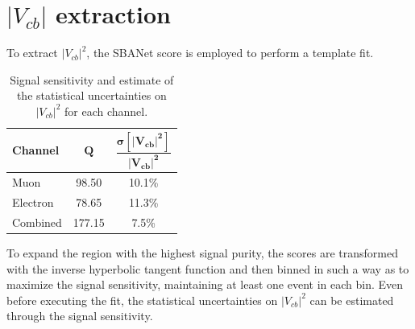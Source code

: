 \section{$|V_{cb}|$ extraction}
To extract $|V_{cb}|^2$, the SBANet score is employed to perform a template fit.

\begin{minipage}{\linewidth}
\begin{minipage}{0.43\linewidth}
\begin{table}[H]
    \centering
    \begin{tabular}{l|cc}
    \toprule
        \textbf{Channel} & $\bm{Q}$ & $\dfrac{\bm{\sigma[|V_{cb}|^2]}}{\bm{|V_{cb}|^2}}$ \\
        \midrule
         Muon & 98.50 & 10.1\%\\
         Electron & 78.65 &  11.3\%\\
         Combined & 177.15 & 7.5\%\\
         \bottomrule
    \end{tabular}
    \caption{Signal sensitivity and estimate of the statistical uncertainties on $|V_{cb}|^2$ for each channel.}
    \label{tab:stat_unc}
\end{table}
    
\end{minipage}
\hfill
\begin{minipage}{0.52\linewidth}
    To expand the region with the highest signal purity, the scores are transformed with the inverse hyperbolic tangent function and then binned in such a way as to maximize the signal sensitivity, maintaining at least one event in each bin.
    Even before executing the fit, the statistical uncertainties on $|V_{cb}|^2$ can be estimated through the signal sensitivity.
\end{minipage}

    
\end{minipage}

